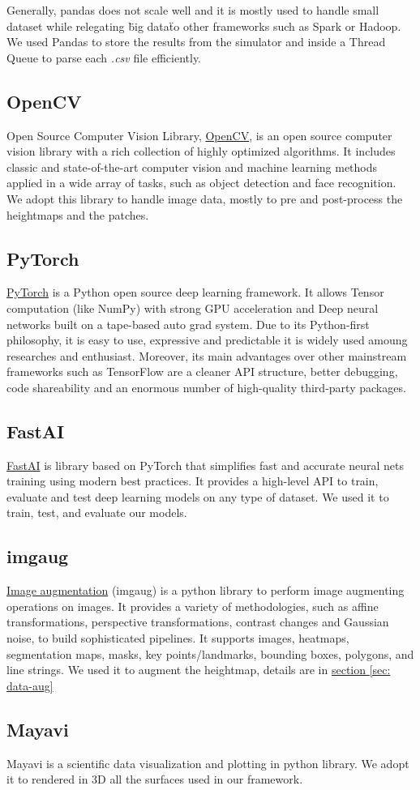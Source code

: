 \documentclass[../document.tex]{subfiles}
\begin{document}
Generally, pandas does not scale well and it is mostly used to handle small dataset while relegating \"big data\" to other frameworks such as Spark or Hadoop. We used Pandas to store the results from the simulator and inside a Thread Queue to parse each \emph{.csv} file efficiently. 

\subsection{OpenCV}
Open Source Computer Vision Library, \href{https://opencv.org/}{OpenCV}, is an open source computer vision library with a rich collection of highly optimized algorithms. It includes classic and state-of-the-art computer vision and machine learning methods applied in a wide array of tasks, such as object detection and face recognition. We adopt this library to handle image data, mostly to pre and post-process the heightmaps and the patches.
\subsection{PyTorch}
\href{https://pytorch.org/}{PyTorch} is a Python open source deep learning framework. It allows Tensor computation (like NumPy) with strong GPU acceleration and Deep neural networks built on a tape-based auto grad system. Due to its Python-first philosophy, it is easy to use, expressive and predictable it is widely used amoung researches and enthusiast. Moreover, its main advantages over other mainstream frameworks such as TensorFlow \cite{tensorflow} are a cleaner API structure, better debugging, code shareability and an enormous number of high-quality third-party packages.

\subsection{FastAI}
\href{https://course.fast.ai/}{FastAI} is library based on PyTorch that simplifies fast and accurate neural nets training using modern best practices. It provides a high-level API to train, evaluate and test deep learning models on any type of dataset. We used it to train, test, and evaluate our models.

\subsection{imgaug}
\href{https://imgaug.readthedocs.io/en/latest/}{Image augmentation} (imgaug) is a python library to perform image augmenting operations on images. It provides a variety of methodologies, such as affine transformations, perspective transformations, contrast changes and Gaussian noise, to build sophisticated pipelines. It supports images,  heatmaps, segmentation maps, masks, key points/landmarks, bounding boxes, polygons, and line strings. We used it to augment the heightmap, details are in \hyperref[sec: data-aug]{section \ref{sec: data-aug}}

\subsection{Mayavi}
Mayavi is a scientific data visualization and plotting in python library. We adopt it to rendered in 3D all the surfaces used in our framework.
\end{document}
